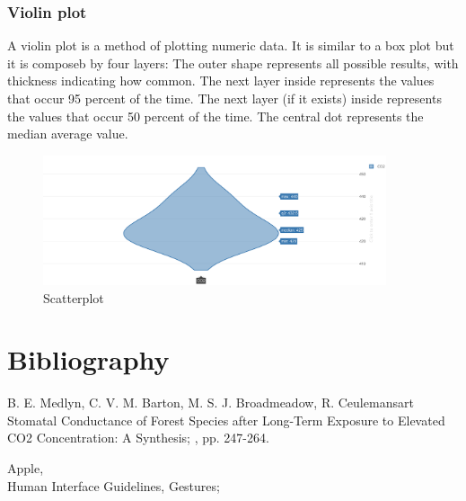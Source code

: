 \documentclass[12pt]{article} %
\begin{document}
\subsubsection{Violin plot}
A violin plot is a method of plotting numeric data. It is similar to a box plot but it is composeb by four layers: The outer shape represents all possible results, with thickness indicating how common. The next layer inside represents the values that occur 95 percent of the time. The next layer (if it exists) inside represents the values that occur 50 percent of the time. The central dot represents the median average value. 
\begin{figure}[H]
  \centering
  \includegraphics[width=0.9\textwidth]{img/violinChart.png}
  \caption{Scatterplot}
  \label{fig:scttrPlot}
\end{figure}






\newpage
\section{Bibliography}
\begin{thebibliography}{99} %

\bibitem B. E. Medlyn, C. V. M. Barton, M. S. J. Broadmeadow, R. Ceulemans{art}
Stomatal Conductance of Forest Species after Long-Term Exposure to Elevated CO2 Concentration: A Synthesis;
,  pp. 247-264.

\bibitem {}
Apple,\\ Human Interface Guidelines, Gestures; \\

 
\end{thebibliography}

\end{document}
